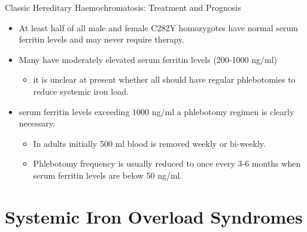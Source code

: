 \documentclass[presentation, smaller]{beamer}
\begin{document}
\begin{frame}[label={sec:org550cff5}]{Classic Hereditary Haemochromatosis: Treatment and Prognosis}
\begin{itemize}
\item At least half of all male and female C282Y homozygotes have normal
serum ferritin levels and may never require therapy.
\item Many have moderately elevated serum ferritin levels  (200-1000 ng/ml)
\begin{itemize}
\item it is unclear at present whether all should have regular
phlebotomies to reduce systemic iron load.
\end{itemize}
\item serum ferritin levels exceeding 1000 ng/ml a phlebotomy regimen is clearly
necessary.
\begin{itemize}
\item In adults initially 500 ml blood is removed weekly or bi-weekly.
\item Phlebotomy frequency is usually reduced to once every 3-6 months
when serum ferritin levels are below 50 ng/ml.
\end{itemize}
\end{itemize}
\end{frame}


\section{Systemic Iron Overload Syndromes}
\label{sec:org925ece4}
\end{document}
